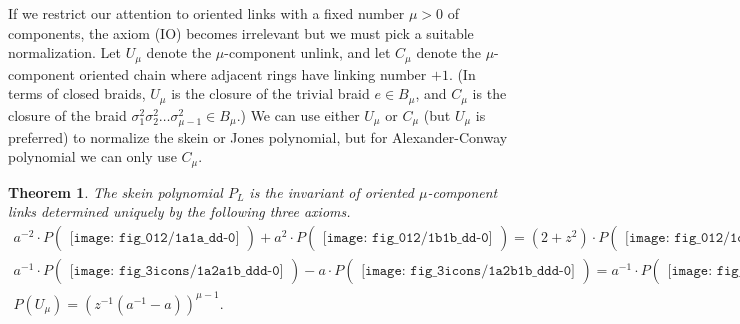\documentclass[12pt]{amsart}
\newtheorem{thm}{Theorem}[section]
\theoremstyle{definition}
\theoremstyle{remark}
\begin{document}
If we restrict our attention to oriented links with a fixed number $\mu>0$ of components,
the axiom (IO) becomes irrelevant but we must pick a suitable normalization.
Let $U_\mu$ denote the $\mu$-component unlink, and
let $C_\mu$ denote the $\mu$-component oriented chain
where adjacent rings have linking number $+1$.
(In terms of closed braids, $U_\mu$ is the closure of the trivial braid $e\in B_\mu$,
and $C_\mu$ is the closure of the braid $\sigma_1^2\sigma_2^2\dots\sigma_{\mu-1}^2\in B_\mu$.)
We can use either $U_\mu$ or $C_\mu$ (but $U_\mu$ is preferred) to normalize the skein or Jones polynomial,
but for Alexander-Conway polynomial we can only use $C_\mu$.

\begin{thm}
\label{thm:HOMFLY_knot}
The skein polynomial $P_L$ is
the invariant of oriented $\mu$-compo\-nent links
determined uniquely by the following three axioms.
{\allowdisplaybreaks
\begin{gather*}
a^{-2}\cdot P
\begin{pmatrix}
\texttt{[image: fig\_012/1a1a\_dd-0]}
\end{pmatrix}
+a^2\cdot P
\begin{pmatrix}
\texttt{[image: fig\_012/1b1b\_dd-0]}
\end{pmatrix}
=(2+z^2)
\cdot P
\begin{pmatrix}
\texttt{[image: fig\_012/1oo\_dd-0]}
\end{pmatrix} ;
\tag*{\rm(II)}
\\
a^{-1}\cdot P
\begin{pmatrix}
\texttt{[image: fig\_3icons/1a2a1b\_ddd-0]}
\end{pmatrix}
-a\cdot P
\begin{pmatrix}
\texttt{[image: fig\_3icons/1a2b1b\_ddd-0]}
\end{pmatrix}
=
a^{-1}\cdot P
\begin{pmatrix}
\texttt{[image: fig\_3icons/1b2a1a\_ddd-0]}
\end{pmatrix}
-a\cdot P
\begin{pmatrix}
\texttt{[image: fig\_3icons/1b2b1a\_ddd-0]}
\end{pmatrix} ;
\tag*{\rm(III)}
\\[2ex]
P(U_\mu) = (z^{-1}(a^{-1}-a))^{\mu-1} .
\tag*{\rm(U)}
\end{gather*}
}
\end{thm}
\end{document}

